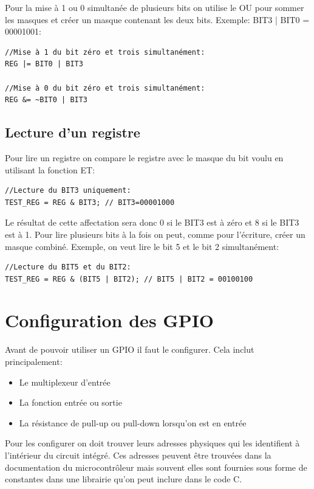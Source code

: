 Pour la mise à 1 ou 0 simultanée de plusieurs bits on utilise le OU pour sommer les masques et créer un masque contenant les deux bits. Exemple: BIT3 | BIT0 = 00001001:

\lstset{style=customc}
\begin{lstlisting}
//Mise à 1 du bit zéro et trois simultanément:
REG |= BIT0 | BIT3

//Mise à 0 du bit zéro et trois simultanément:
REG &= ~BIT0 | BIT3
\end{lstlisting}

\subsection{Lecture d'un registre}

Pour lire un registre on compare le registre avec le masque du bit voulu en utilisant la fonction ET: 

\lstset{style=customc}
\begin{lstlisting}
//Lecture du BIT3 uniquement:
TEST_REG = REG & BIT3; // BIT3=00001000
\end{lstlisting}

Le résultat de cette affectation sera donc 0 si le BIT3 est à zéro et 8 si le BIT3 est à 1. Pour lire plusieurs bits à la fois on peut, comme pour l'écriture, créer un masque combiné. Exemple, on veut lire le bit 5 et le bit 2 simultanément:

\lstset{style=customc}
\begin{lstlisting}
//Lecture du BIT5 et du BIT2:
TEST_REG = REG & (BIT5 | BIT2); // BIT5 | BIT2 = 00100100
\end{lstlisting}

\section{Configuration des GPIO}

Avant de pouvoir utiliser un GPIO il faut le configurer. Cela inclut principalement:

\begin{itemize}[label=\textbullet,font=\small]
\item Le multiplexeur d'entrée
\item La fonction entrée ou sortie
\item La résistance de pull-up ou pull-down lorsqu'on est en entrée
\end{itemize}

Pour les configurer on doit trouver leurs adresses physiques qui les identifient à l'intérieur du circuit intégré. Ces adresses peuvent être trouvées dans la documentation du microcontrôleur mais souvent elles sont fournies sous forme de constantes dans une librairie qu'on peut inclure dans le code C.

